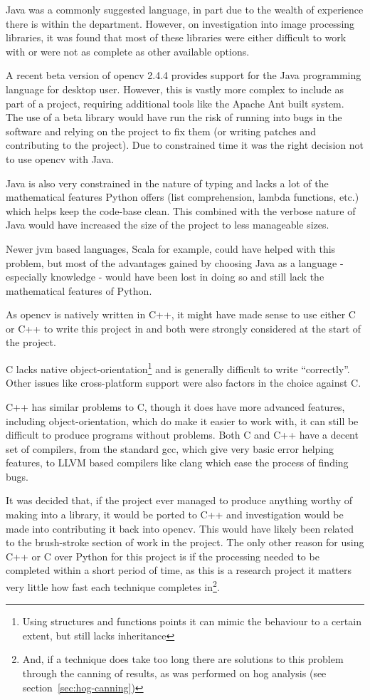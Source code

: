 Java was a commonly suggested language, in part due to the wealth of experience there is within
the department. However, on investigation into image processing libraries, it was found that most
of these libraries were either difficult to work with or were not as complete as other available
options.

A recent beta version of \gls{opencv} 2.4.4 provides support for the Java programming language
for desktop user. However, this is vastly more complex to include as part of a project, requiring
additional tools like the Apache Ant built system. The use of a beta library would have run the 
risk of running into bugs in the software and relying on the project to fix them (or writing 
patches and contributing to the project). Due to constrained time it was the right decision not to
use \gls{opencv} with Java.

Java is also very constrained in the nature of typing and lacks a lot of the mathematical features
Python offers (list comprehension, lambda functions, etc.) which helps keep the code-base clean.
This combined with the verbose nature of Java would have increased the size of the project to
less manageable sizes.

Newer \gls{jvm} based languages, Scala for example, could have helped with this problem, but most
of the advantages gained by choosing Java as a language - especially knowledge - would have been
lost in doing so and still lack the mathematical features of Python.

As \gls{opencv} is natively written in C++, it might have made sense to use either C or C++ to write 
this project in and both were strongly considered at the start of the project.

C lacks native object-orientation\footnote{Using structures and functions points it can mimic the 
behaviour to a certain extent, but still lacks inheritance} and is generally difficult to write 
``correctly''. Other issues like cross-platform support were also factors in the choice against C.

C++ has similar problems to C, though it does have more advanced features, including 
object-orientation, which do make it easier to work with, it can still be difficult to produce 
programs without problems. Both C and C++ have a decent set of compilers, from the standard 
\gls{gcc}, which give very basic error helping features, to LLVM based compilers like clang which 
ease the process of finding bugs.

It was decided that, if the project ever managed to produce anything worthy of making into a
library, it would be ported to C++ and investigation would be made into contributing it back into
\gls{opencv}. This would have likely been related to the brush-stroke section of work in the project. 
The only other reason for using C++ or C over Python for this project is if the processing needed
to be completed within a short period of time, as this is a research project it matters very 
little how fast each technique completes in\footnote{And, if a technique does take too long there 
are solutions to this problem through the canning of results, as was performed on \gls{hog} 
analysis (see section~\ref{sec:hog-canning})}.

